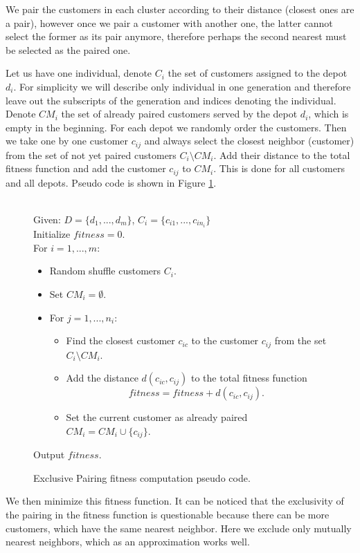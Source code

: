 \documentclass[conference]{IEEEtran}
\begin{document}
We pair the customers in each cluster according to their distance (closest ones are a pair), however once we pair a customer with another one, the latter cannot select the former as its pair anymore, therefore perhaps the second nearest must be selected as the paired one.

Let us have one individual, denote $C_i$ the set of customers assigned to the depot $d_i$. For simplicity we will describe only individual in one generation and therefore leave out the subscripts of the generation and indices denoting the individual. Denote $CM_i$ the set of already paired customers served by the depot $d_i$, which is empty in the beginning. For each depot we randomly order the customers. Then we take one by one customer $c_{ij}$ and always select the closest neighbor (customer) from the set of not yet paired customers $C_i \setminus CM_i$. Add their distance to the total fitness function and add the customer $c_{ij}$ to $CM_i$. This is done for all customers and all depots. Pseudo code is shown in Figure \ref{pseudocode}.
\begin{figure}
    \hrulefill\\
  Given: $D = \{d_1,...,d_m\}$, $C_i = \{c_{i1},...,c_{in_i}\}$ \\
  Initialize $fitness = 0$. \\
  For $i = 1,...,m$: 
  \begin{itemize}
    \item Random shuffle customers $C_i$.
    \item Set $CM_i = \emptyset$.
    \item For $j = 1,...,n_i$: 
    \begin{itemize}
      \item Find the closest customer $c_{ic}$ to the customer $c_{ij}$ from the set $C_i \setminus CM_i$.
      \item Add the distance $d(c_{ic},c_{ij})$ to the total fitness function
      \[
        fitness = fitness + d(c_{ic},c_{ij}).
      \]
      \item Set the current customer as already paired $CM_i = CM_i \cup \{c_{ij}\}$.
    \end{itemize}
  \end{itemize}
  Output $fitness$.

  \hrulefill
    \caption{Exclusive Pairing fitness computation pseudo code.}
    \label{pseudocode}
\end{figure}

We then minimize this fitness function. It can be noticed that the exclusivity of the pairing in the fitness function is questionable because there can be more customers, which have the same nearest neighbor. Here we exclude only mutually nearest neighbors, which as an approximation works well.
\end{document}
